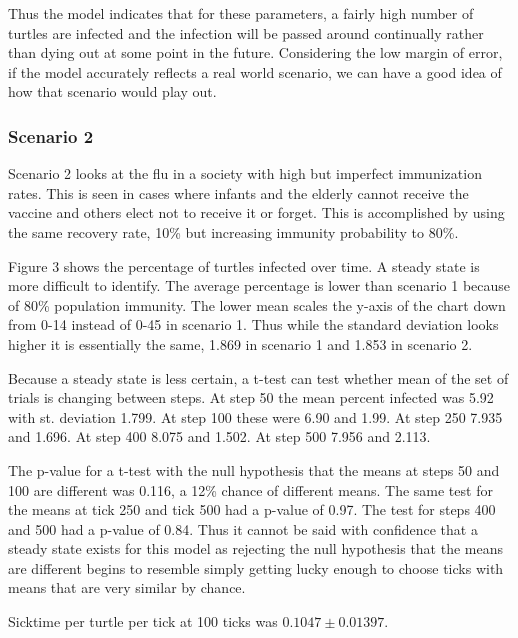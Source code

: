 \documentclass[11pt]{article} %
\begin{document}
Thus the model indicates that for these parameters, a fairly high number of turtles are infected and the infection will be passed around continually rather than dying out at some point in the future. Considering the low margin of error, if the model accurately reflects a real world scenario, we can have a good idea of how that scenario would play out. 

\subsubsection{Scenario 2}

Scenario 2 looks at the flu in a society with high but imperfect immunization rates. This is seen in cases where infants and the elderly cannot receive the vaccine and others elect not to receive it or forget. This is accomplished by using the same recovery rate, 10\% but increasing immunity probability to 80\%. 



Figure 3 shows the percentage of turtles infected over time. A steady state is more difficult to identify. The average percentage is lower than scenario 1 because of 80\% population immunity. The lower mean scales the y-axis of the chart down from 0-14 instead of 0-45 in scenario 1. Thus while the standard deviation looks higher it is essentially the same, 1.869 in scenario 1 and 1.853 in scenario 2. 

Because a steady state is less certain, a t-test can test whether mean of the set of trials is changing between steps. At step 50 the mean percent infected was 5.92 with st. deviation 1.799. At step 100 these were 6.90 and 1.99. At step 250 7.935 and 1.696. At step 400 8.075 and 1.502. At step 500 7.956 and 2.113. 

The p-value for a t-test with the null hypothesis that the means at steps 50 and 100 are different was 0.116, a 12\% chance of different means. The same test for the means at tick 250 and tick 500 had a p-value of 0.97. The test for steps 400 and 500 had a p-value of 0.84. Thus it cannot be said with  confidence that a steady state exists for this model as rejecting the null hypothesis that the means are different begins to resemble simply getting lucky enough to choose ticks with means that are very similar by chance. 

Sicktime per turtle per tick at 100 ticks was $ 0.1047 \pm 0.01397$.
\end{document}
